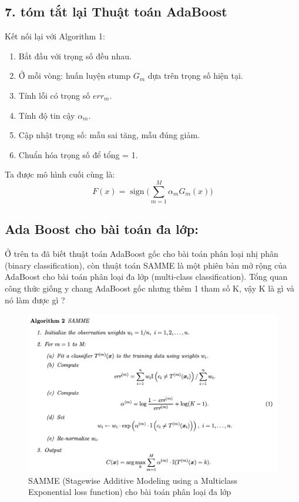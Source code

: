 \documentclass[11pt]{article}
\begin{document}
\subsection*{7. tóm tắt lại Thuật toán AdaBoost}

Kết nối lại với Algorithm 1:
\begin{enumerate}
    \item Bắt đầu với trọng số đều nhau.  
    \item Ở mỗi vòng: huấn luyện stump \(G_m\) dựa trên trọng số hiện tại.  
    \item Tính lỗi có trọng số \(err_m\).  
    \item Tính độ tin cậy \(\alpha_m\).  
    \item Cập nhật trọng số: mẫu sai tăng, mẫu đúng giảm.  
    \item Chuẩn hóa trọng số để tổng = 1.  
\end{enumerate}

Ta được mô hình cuối cùng là:
\[
F(x) = \operatorname{sign}\Big(\sum_{m=1}^M \alpha_m G_m(x)\Big)
\]


\subsection{Ada Boost cho bài toán đa lớp:} Ở trên ta đã biết thuật toán AdaBoost gốc cho bài toán phân loại nhị phân (binary classification), còn thuật toán SAMME là một phiên bản mở rộng của AdaBoost cho bài toán phân loại đa lớp (multi-class classification). Tổng quan công thức giống y chang AdaBoost gốc nhưng thêm 1 tham số K, vậy K là gì và nó làm được gì ?

\begin{figure}[H]
    \centering
    \includegraphics[width=0.7\linewidth]{images/math_ada_2.png}
    \caption{SAMME (Stagewise Additive Modeling using a Multiclass Exponential loss function) cho bài toán phân loại đa lớp}
\end{figure}
\end{document}
